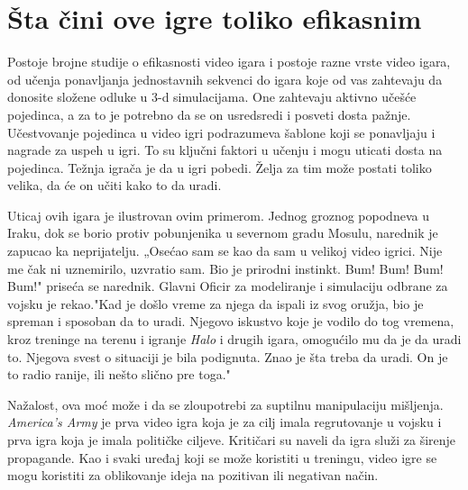 \documentclass[a4paper]{article}
\begin{document}
\section{Šta čini ove igre toliko efikasnim}
\label{sec:efikasno}
Postoje brojne studije o efikasnosti video igara i postoje razne
vrste video igara, od učenja ponavljanja jednostavnih sekvenci do igara koje od vas zahtevaju da donosite složene odluke u 3-d simulacijama. 
One zahtevaju aktivno učešće pojedinca, a za to je potrebno da se on usredsredi i posveti dosta pažnje. 
Učestvovanje pojedinca u video igri podrazumeva šablone koji se ponavljaju i nagrade za uspeh u igri. To su ključni
faktori u učenju i mogu uticati dosta na pojedinca. Težnja igrača je da u igri pobedi. Želja za tim može postati toliko velika, da će on učiti kako to da uradi.

Uticaj ovih igara je ilustrovan ovim primerom. Jednog groznog popodneva u
Iraku, dok se borio protiv pobunjenika u severnom gradu Mosulu, narednik je zapucao ka neprijatelju.
„Osećao sam se kao da sam u velikoj video igrici. Nije me čak ni uznemirilo, uzvratio sam.
Bio je prirodni instinkt. Bum! Bum! Bum! Bum!" priseća se narednik. Glavni
Oficir za modeliranje i simulaciju odbrane za vojsku je rekao."Kad je došlo vreme za njega
da ispali iz svog oružja, bio je spreman i sposoban da to uradi.
Njegovo iskustvo koje je vodilo do tog vremena, kroz treninge na terenu i igranje {\em Halo} i
drugih igara, omogućilo mu da je da uradi to. Njegova svest o situaciji je bila podignuta. Znao je šta treba da
uradi. On je to radio ranije, ili nešto slično pre toga."\cite{washingtonpost}

Nažalost, ova moć može i da se zloupotrebi za suptilnu manipulaciju mišljenja. {\em America's Army} je prva video igra koja je za cilj
imala regrutovanje u vojsku i prva igra koja je imala političke ciljeve. Kritičari su naveli da igra služi za širenje propagande. Kao i svaki uređaj koji se može koristiti u treningu, video igre se mogu koristiti za oblikovanje
ideja na pozitivan ili negativan način.\cite{wikipedia_american_army}
\end{document}
